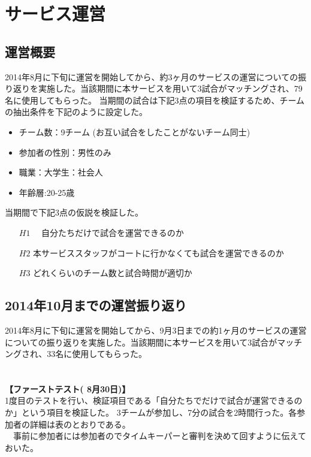 \chapter{サービス運営}

\section{運営概要}
2014年8月に下旬に運営を開始してから、約3ヶ月のサービスの運営についての振り返りを実施した。当該期間に本サービスを用いて3試合がマッチングされ、79名に使用してもらった。
当期間の試合は下記3点の項目を検証するため、チームの抽出条件を下記のように設定した。
\begin{itemize}
	\item チーム数：9チーム (お互い試合をしたことがないチーム同士)
	\item 参加者の性別：男性のみ
	\item 職業：大学生：社会人
	\item 年齢層:20-25歳
\end{itemize}



当期間で下記3点の仮説を検証した。
\begin{itemize}
	\item[$H1$]　自分たちだけで試合を運営できるのか
	\item[$H2$] 本サービススタッフがコートに行かなくても試合を運営できるのか
	\item[$H3$] どれくらいのチーム数と試合時間が適切か
\end{itemize}






\section{2014年10月までの運営振り返り}

2014年8月に下旬に運営を開始してから、9月3日までの約1ヶ月のサービスの運営についての振り返りを実施した。当該期間に本サービスを用いて3試合がマッチングされ、33名に使用してもらった。
\\
\\
\\\textbf{【ファーストテスト( 8月30日)】}
\\1度目のテストを行い、検証項目である「自分たちでだけで試合が運営できるのか」という項目を検証した。
3チームが参加し、7分の試合を2時間行った。各参加者の詳細は表のとおりである。
\\　事前に参加者には参加者のでタイムキーパーと審判を決めて回すように伝えておいた。

